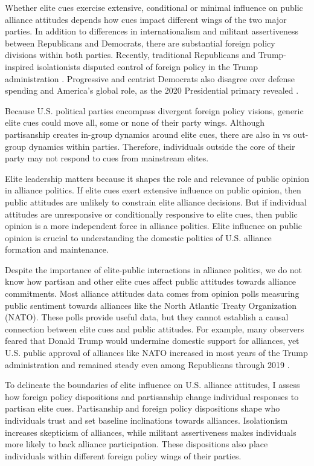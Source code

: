 \documentclass[12pt]{article}
\begin{document}
Whether elite cues exercise extensive, conditional or minimal influence on public alliance attitudes depends how cues impact different wings of the two major parties. 
In addition to differences in internationalism and militant assertiveness between Republicans and Democrats, there are substantial foreign policy divisions within both parties.
Recently, traditional Republicans and Trump-inspired isolationists disputed control of foreign policy in the Trump administration \citep{Dueck2019}.
Progressive and centrist Democrats also disagree over defense spending and America's global role, as the 2020 Presidential primary revealed \citep{Robinson2019demfp}.


Because U.S. political parties encompass divergent foreign policy visions, generic elite cues could move all, some or none of their party wings.
Although partisanship creates in-group dynamics around elite cues, there are also in vs out-group dynamics within parties. 
Therefore, individuals outside the core of their party may not respond to cues from mainstream elites.


Elite leadership matters because it shapes the role and relevance of public opinion in alliance politics.
If elite cues exert extensive influence on public opinion, then public attitudes are unlikely to constrain elite alliance decisions.
But if individual attitudes are unresponsive or conditionally responsive to elite cues, then public opinion is a more independent force in alliance politics. 
Elite influence on public opinion is crucial to understanding the domestic politics of U.S. alliance formation and maintenance.  


Despite the importance of elite-public interactions in alliance politics, we do not know how partisan and other elite cues affect public attitudes towards alliance commitments. 
Most alliance attitudes data comes from opinion polls measuring public sentiment towards alliances like the North Atlantic Treaty Organization (NATO).
These polls provide useful data, but they cannot establish a causal connection between elite cues and public attitudes.
For example, many observers feared that Donald Trump would undermine domestic support for alliances, yet U.S. public approval of alliances like NATO increased in most years of the Trump administration and remained steady even among Republicans through 2019 \citep{PewNATO2020}.


To delineate the boundaries of elite influence on U.S. alliance attitudes, I assess how foreign policy dispositions and partisanship change individual responses to partisan elite cues.
Partisanship and foreign policy dispositions shape who individuals trust and set baseline inclinations towards alliances. 
Isolationism increases skepticism of alliances, while militant assertiveness makes individuals more likely to back alliance participation. 
These dispositions also place individuals within different foreign policy wings of their parties. 
\end{document}
